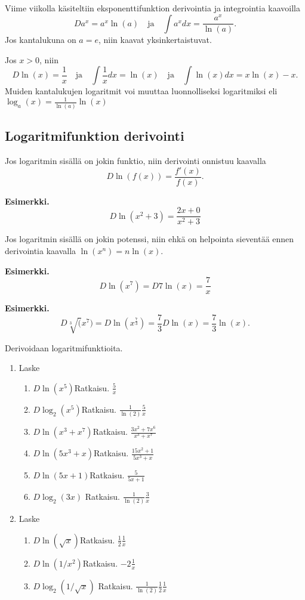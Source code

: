 \documentclass[10pt]{article}
\newcommand{\ratkaisu}[1]{\hfill{\color{blue}\quad\textrm{Ratkaisu. } #1}}
\begin{document}
Viime viikolla käsiteltiin eksponenttifunktion derivointia ja integrointia kaavoilla
\begin{equation*}
\label{eq:axderi}
Da^x=a^x\ln(a)
\quad\textrm{ja}\quad
\int a^xdx=\frac{a^x}{\ln(a)}.
\end{equation*}
Jos kantalukuna on $a=e$, niin kaavat yksinkertaistuvat.

Jos $x>0$, niin
$$
D\ln(x)=\frac{1}{x}
\quad\textrm{ja}\quad
\int \frac{1}{x}dx=\ln(x)
\quad\textrm{ja}\quad
\int \ln(x)dx=x\ln(x)-x.
$$
Muiden kantalukujen logaritmit voi muuttaa luonnolliseksi logaritmiksi eli $\log_a(x)=\frac{1}{\ln(a)}\ln(x)$

\subsection{Logaritmifunktion derivointi}

Jos logaritmin sisällä on jokin funktio, niin derivointi onnistuu kaavalla
$$
D\ln(f(x))=\frac{f'(x)}{f(x)}.
$$

\textbf{Esimerkki.}
$$
D\ln(x^2+3)=\dfrac{2x+0}{x^2+3}
$$

Jos logaritmin sisällä on jokin potenssi, niin ehkä on helpointa sieventää ennen derivointia kaavalla $\ln(x^n)=n\ln(x)$.

\textbf{Esimerkki.}
$$
D\ln(x^7)=D 7\ln(x)=\frac{7}{x}
$$

\textbf{Esimerkki.}
$$
D\sqrt[3](x^7)=D \ln(x^\frac{7}{3})=\frac{7}{3}D\ln(x)=\frac{7}{3}\ln(x).
$$

Derivoidaan logaritmifunktioita.

\begin{enumerate}
\item Laske
\begin{enumerate}
\item $D\ln(x^5)$\ratkaisu{$\frac{5}{x}$}
\item $D\log_2(x^5)$\ratkaisu{$\frac{1}{\ln(2)}\frac{5}{x}$}
\item $D\ln(x^3+x^7)$\ratkaisu{$\frac{3x^2+7x^6}{x^3+x^7}$}
\item $D\ln(5x^3+x)$\ratkaisu{$\frac{15x^2+1}{5x^3+x}$}
\item $D\ln(5x+1)$\ratkaisu{$\frac{5}{5x+1}$}
\item $D\log_2(3x)$
\ratkaisu{$\frac{1}{\ln(2)}\frac{3}{x}$}
\end{enumerate}
\item Laske
\begin{enumerate}
\item $D\ln(\sqrt{x})$\ratkaisu{$\frac{1}{2}\frac{1}{x}$}
\item $D\ln(1/x^2)$\ratkaisu{$-2\frac{1}{x}$}
\item $D\log_2(1/\sqrt{x})$
\ratkaisu{$\frac{1}{\ln(2)}\frac{1}{2}\frac{1}{x}$}
\end{enumerate}
\end{enumerate}
\end{document}
